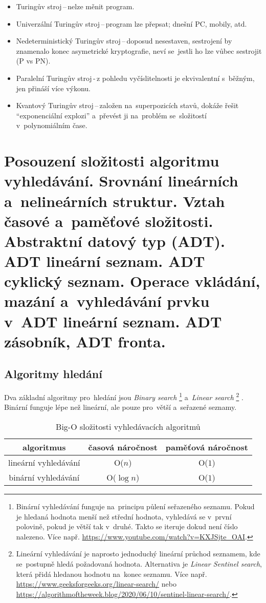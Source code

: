 \begin{itemize}
	\item Turingův stroj\,--\,nelze měnit program.
	\item Univerzální Turingův stroj\,--\,program lze přepsat; dnešní PC, mobily, atd.
	\item Nedeterministický Turingův stroj\,--\,doposud nesestaven, sestrojení by znamenalo konec asymetrické kryptografie, neví se~jestli ho lze vůbec sestrojit (P vs PN).
	\item Paralelní Turingův stroj\,-\,z pohledu vyčíslitelnosti je ekvivalentní s~běžným, jen přináší více výkonu.
	\item Kvantový Turingův stroj\,--\,založen na~superpozicích stavů, dokáže řešit \enquote{exponenciální explozi} a~převést ji na~problém se~složitostí v~polynomiálním čase.
\end{itemize}

\clearpage
\section{Posouzení složitosti algoritmu vyhledávání. Srovnání lineárních a~nelineárních struktur. Vztah časové a~paměťové složitosti. Abstraktní datový typ (ADT). ADT lineární seznam. ADT cyklický seznam. Operace vkládání, mazání a~vyhledávání prvku v~ADT lineární seznam. ADT zásobník, ADT fronta.}

\subsection{Algoritmy hledání}

Dva základní algoritmy pro~hledání jsou \textit{Binary search}%
\footnote{Binární vyhledávání funguje na~principu půlení seřazeného seznamu. Pokud je hledaná hodnota menší než střední hodnota, vyhledává se v~první polovině, pokud je větší tak v~druhé. Takto se iteruje dokud není číslo nalezeno. Více např. \url{https://www.youtube.com/watch?v=KXJSjte_OAI}.} %
a~\textit{Linear search}%
\footnote{Lineární vyhledávání je naprosto jednoduchý lineární průchod seznamem, kde se~postupně hledá požadovaná hodnota. Alternativa je \emph{Linear Sentinel search}, která přidá hledanou hodnotu na~konec seznamu. Více např. \url{https://www.geeksforgeeks.org/linear-search/} nebo \url{https://algorithmoftheweek.blog/2020/06/10/sentinel-linear-search/}.}%
. Binární funguje lépe než lineární, ale pouze pro~větší a~seřazené seznamy.

\begin{table}[h]
	\centering
	\caption{Big-O složitosti vyhledávacích algoritmů}
	\begin{tabular}{|c||c|c|}\hline
		algoritmus           & časová náročnost & paměťová náročnost \\\hline\hline
		lineární vyhledávání & O(\( n \))       & O(\( 1 \))         \\\hline
		binární vyhledávání  & O(\( \log n \))  & O(\( 1 \))         \\\hline
	\end{tabular}
\end{table}

